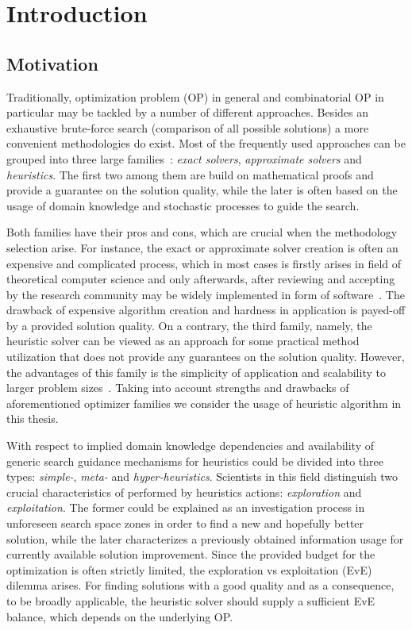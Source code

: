 \chapter{Introduction}\label{intro}

\section{Motivation}
Traditionally, optimization problem (OP) in general and combinatorial OP in particular may be tackled by a number of different approaches. Besides an exhaustive brute-force search (comparison of all possible solutions) a more convenient methodologies do exist. Most of the frequently used approaches can be grouped into three large families~\cite{junger2003combinatorial,biegler2004retrospective,festa2014brief}: \emph{exact solvers}, \emph{approximate solvers} and \emph{heuristics}. The first two among them are build on mathematical proofs and provide a guarantee on the solution quality, while the later is often based on the usage of domain knowledge and stochastic processes to guide the search. 

Both families have their pros and cons, which are crucial when the methodology selection arise. For instance, the exact or approximate solver creation is often an expensive and complicated process, which in most cases is firstly arises in field of theoretical computer science and only afterwards, after reviewing and accepting by the research community may be widely implemented in form of software~\cite{woeginger2003exact,roubivcek2011relaxation}. The drawback of expensive algorithm creation and hardness in application is payed-off by a provided solution quality. On a contrary, the third family, namely, the heuristic solver can be viewed as an approach for some practical method utilization that does not provide any guarantees on the solution quality. However, the advantages of this family is the simplicity of application and scalability to larger problem sizes~\cite{festa2014brief}. Taking into account strengths and drawbacks of aforementioned optimizer families we consider the usage of heuristic algorithm in this thesis.

With respect to implied domain knowledge dependencies and availability of generic search guidance mechanisms for heuristics could be divided into three types: \emph{simple-}, \emph{meta-} and \emph{hyper-heuristics}. Scientists in this field distinguish two crucial characteristics of performed by heuristics actions: \emph{exploration} and \emph{exploitation}. The former could be explained as an investigation process in unforeseen search space zones in order to find a new and hopefully better solution, while the later characterizes a previously obtained information usage for currently available solution improvement. Since the provided budget for the optimization is often strictly limited, the exploration vs exploitation (EvE) dilemma arises. For finding solutions with a good quality and as a consequence, to be broadly applicable, the heuristic solver should supply a sufficient EvE balance, which depends on the underlying OP.

